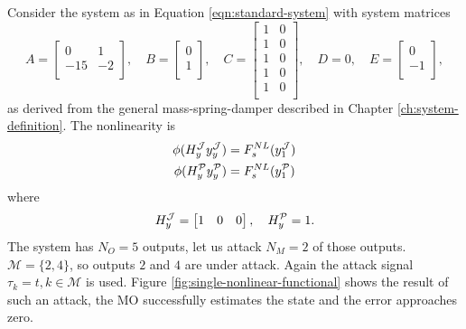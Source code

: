 \begin{example}\label{ex:single-mass-nonlinear-example}
    Consider the system as in Equation \eqref{eqn:standard-system} with system matrices
    \begin{equation*}
        A =
        \begin{bmatrix}
            0 & 1 \\ -15 & -2 \\
        \end{bmatrix}, \quad
        B =
        \begin{bmatrix}
            0 \\ 1 \\
        \end{bmatrix}, \quad
        C = 
        \begin{bmatrix}
            1 & 0 \\ 1 & 0 \\ 1 & 0 \\ 1 & 0 \\ 1 & 0 \\
        \end{bmatrix}, \quad
        D = 0, \quad
        E =
        \begin{bmatrix}
            0 \\ -1 \\
        \end{bmatrix},   
    \end{equation*}
    as derived from the general mass-spring-damper described in Chapter \ref{ch:system-definition}.  The nonlinearity is
    \begin{equation*}
        \begin{split}
            \phi(H^{\mathcal{J}}_{y}y^{\mathcal{J}}_{y}) &= F^{NL}_s(y^{\mathcal{J}}_{1}) \\
            \phi(H^{\mathcal{P}}_{y}y^{\mathcal{P}}_{y}) &= F^{NL}_s(y^{\mathcal{P}}_{1}) \\
        \end{split}        
    \end{equation*} 
    where
    \begin{equation*}
        H^{\mathcal{J}}_{y} =
        \begin{bmatrix}
            1 & 0 & 0
        \end{bmatrix}, 
        \quad H^{\mathcal{P}}_{y} = 1.
    \end{equation*}
    The system has $N_O=5$ outputs, let us attack $N_M=2$ of those outputs. $\mathcal{M}=\{2,4\}$, so outputs $2$ and $4$ are under attack. Again the attack signal $\tau_k=t,k \in \mathcal{M}$ is used. Figure \ref{fig:single-nonlinear-functional} shows the result of such an attack, the MO successfully estimates the state and the error approaches zero. 

\end{example}
